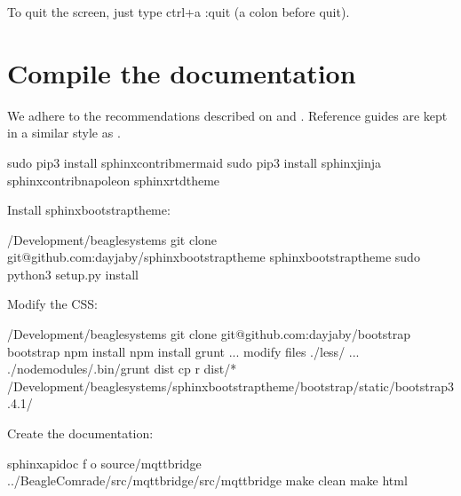\documentclass[letterpaper,10pt,english]{sphinxmanual}
\begin{document}
To quit the screen, just type ctrl+a :quit (a colon before quit).


\section{Compile the documentation}
\label{\detokenize{source/howtos/compile_documentation:compile-the-documentation}}\label{\detokenize{source/howtos/compile_documentation::doc}}
We adhere to the recommendations described on  and . Reference guides are kept in a similar style as .

\begin{sphinxVerbatim}[commandchars=\\\{\}]
sudo pip3 install sphinxcontrib\PYGZhy{}mermaid
sudo pip3 install sphinx\PYGZhy{}jinja sphinxcontrib\PYGZhy{}napoleon sphinx\PYGZhy{}rtd\PYGZhy{}theme
\end{sphinxVerbatim}

Install sphinx\sphinxhyphen{}bootstrap\sphinxhyphen{}theme:

\begin{sphinxVerbatim}[commandchars=\\\{\}]
 \PYGZti{}/Development/beaglesystems
git clone git@github.com:dayjaby/sphinx\PYGZhy{}bootstrap\PYGZhy{}theme
 sphinx\PYGZhy{}bootstrap\PYGZhy{}theme
sudo python3 setup.py install
\end{sphinxVerbatim}

Modify the CSS:

\begin{sphinxVerbatim}[commandchars=\\\{\}]
 \PYGZti{}/Development/beaglesystems
git clone git@github.com:dayjaby/bootstrap
 bootstrap
npm install
npm install grunt
... modify files  ./less/ ...
./node\PYGZus{}modules/.bin/grunt dist
cp \PYGZhy{}r dist/* \PYGZti{}/Development/beaglesystems/sphinx\PYGZhy{}bootstrap\PYGZhy{}theme/bootstrap/static/bootstrap\PYGZhy{}3.4.1/
\end{sphinxVerbatim}

Create the documentation:

\begin{sphinxVerbatim}[commandchars=\\\{\}]
sphinx\PYGZhy{}apidoc \PYGZhy{}f \PYGZhy{}o source/mqtt\PYGZus{}bridge ../BeagleComrade/src/mqtt\PYGZus{}bridge/src/mqtt\PYGZus{}bridge
make clean  make html
\end{sphinxVerbatim}
\end{document}
